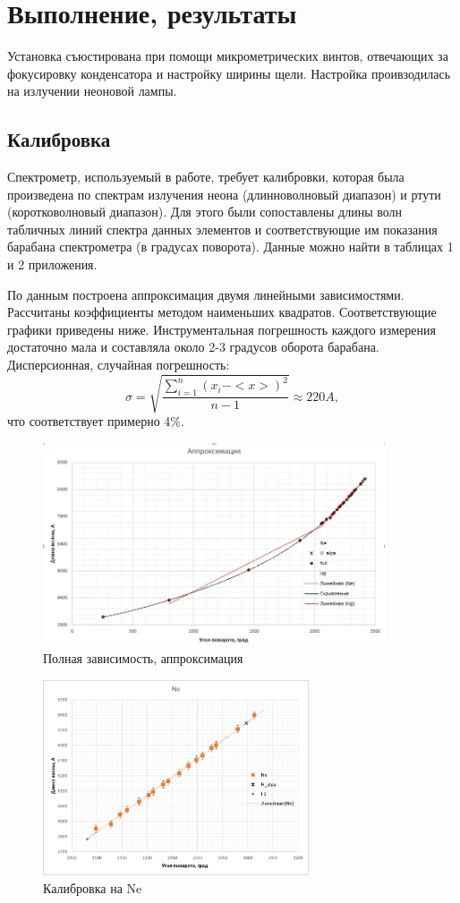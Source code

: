 \section{Выполнение, результаты}
Установка съюстирована при помощи микрометрических винтов, отвечающих за фокусировку конденсатора и настройку ширины щели. Настройка проивзодилась на излучении неоновой лампы.

\subsection{Калибровка}
Спектрометр, используемый в работе, требует калибровки, которая была произведена по спектрам излучения неона (длинноволновый диапазон) и ртути (коротковолновый диапазон). Для этого были сопоставлены длины волн табличных линий спектра данных элементов и соответствующие им показания барабана спектрометра (в градусах поворота). Данные можно найти в таблицах 1 и 2 приложения.

По данным построена аппроксимация двумя линейными зависимостями. Рассчитаны коэффициенты методом наименьших квадратов. Соответствующие графики приведены ниже. Инструментальная погрешность каждого измерения достаточно мала и составляла около 2-3 градусов оборота барабана. Дисперсионная, случайная погрешность:
$$\sigma = \sqrt{\frac{\sum_{i = 1}^n(x_i - <x>)^2}{n - 1}} \approx 220A,$$
что соответствует примерно 4\%. 

\begin{figure}[H]
    \centering
    \includegraphics[width=0.9\textwidth]{img/full.png}
    \caption{Полная зависимость, аппроксимация}
    \label{fig:Ne}
\end{figure}

\begin{figure}[H]
    \centering
    \includegraphics[width=0.7\textwidth]{img/NePlot.png}
    \caption{Калибровка на Ne}
    \label{fig:Ne}
\end{figure}

